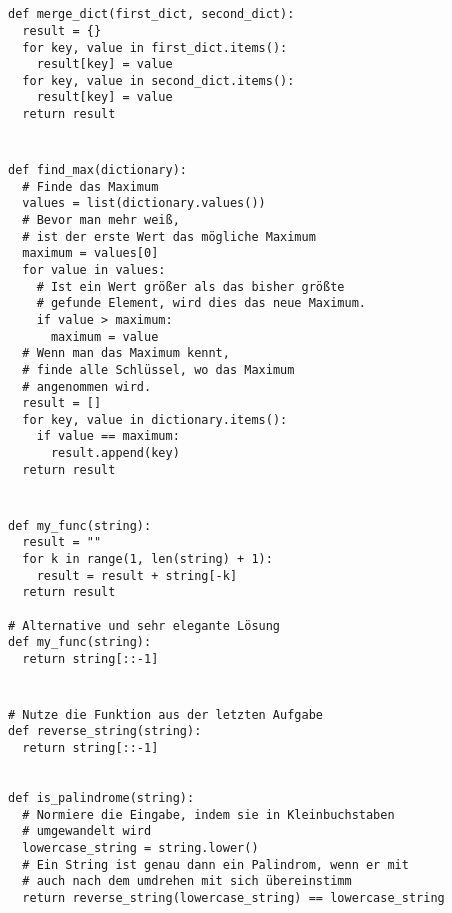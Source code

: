 \documentclass[a4paper]{article}
\begin{document}




\section{}
\begin{verbatim}
def merge_dict(first_dict, second_dict):
  result = {}
  for key, value in first_dict.items():
    result[key] = value
  for key, value in second_dict.items():
    result[key] = value
  return result
\end{verbatim}

\section{}
\begin{verbatim}
def find_max(dictionary):
  # Finde das Maximum
  values = list(dictionary.values())
  # Bevor man mehr weiß,
  # ist der erste Wert das mögliche Maximum
  maximum = values[0]
  for value in values:
    # Ist ein Wert größer als das bisher größte
    # gefunde Element, wird dies das neue Maximum.
    if value > maximum:
      maximum = value
  # Wenn man das Maximum kennt,
  # finde alle Schlüssel, wo das Maximum
  # angenommen wird.
  result = []
  for key, value in dictionary.items():
    if value == maximum:
      result.append(key)
  return result
\end{verbatim}

\section{} 
\begin{verbatim}
def my_func(string):
  result = ""
  for k in range(1, len(string) + 1):
    result = result + string[-k]
  return result

# Alternative und sehr elegante Lösung
def my_func(string):
  return string[::-1]
\end{verbatim}
\newpage
\section{}
\begin{verbatim}
# Nutze die Funktion aus der letzten Aufgabe
def reverse_string(string):
  return string[::-1]


def is_palindrome(string):
  # Normiere die Eingabe, indem sie in Kleinbuchstaben
  # umgewandelt wird
  lowercase_string = string.lower()
  # Ein String ist genau dann ein Palindrom, wenn er mit
  # auch nach dem umdrehen mit sich übereinstimm
  return reverse_string(lowercase_string) == lowercase_string
\end{verbatim}
\end{document}
